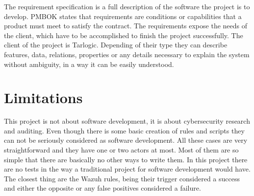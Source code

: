 The requirement specification is a full description of the software the project is to develop.
PMBOK\cite{pmbok} states that requirements are conditions or capabilities that a product must meet to satisfy the contract.
The requirements expose the needs of the client, which have to be accomplished to finish the project successfully.
The client of the project is Tarlogic.
\linej
Depending of their type they can describe features, data, relations, properties or any details necessary to explain the system without ambiguity, in a way it can be easily understood.

\section{Limitations} \label{design_no_need}
This project is not about software development, it is about cybersecurity research and auditing.
\linej
Even though there is some basic creation of rules and scripts they can not be seriously considered as software development.
All these cases are very straightforward and they have one or two actors at most.
Most of them are so simple that there are basically no other ways to write them.
\linej
\linej
In this project there are no tests in the way a traditional project for software development would have.
The closest thing are the Wazuh rules, being their trigger considered a success and either the opposite or any false positives considered a failure.

